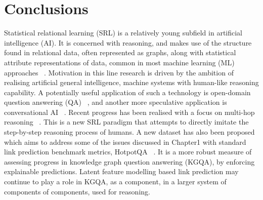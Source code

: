 
\chapter{Conclusions}  %

\ifpdf
    \graphicspath{{Chapter5/Figs/Raster/}{Chapter5/Figs/PDF/}{Chapter5/Figs/}}
\else
    \graphicspath{{Chapter5/Figs/Vector/}{Chapter5/Figs/}}
\fi



Statistical relational learning (SRL) is a relatively young subfield in artificial intelligence (AI). It is concerned with reasoning, and makes use of the structure found in relational data, often represented as graphs, along with statistical attribute representations of data, common in most machine learning (ML) approaches \unskip~\citep{koller2007introduction}. Motivation in this line research is driven by the ambition of realising artificial general intelligence, machine systems with human-like reasoning capability. A potentially useful application of such a technology is open-domain question answering (QA) \unskip~\citep{chen2017reading}, and another more speculative application is conversational AI \unskip~\citep{moon2019opendialkg, basu2019conversational}. Recent progress has been realised with a focus on multi-hop reasoning \unskip~\citep{asai2019learning, lin2018multi, qi2019answering}. This is a new SRL paradigm that attempts to directly imitate the step-by-step reasoning process of humans. A new dataset has also been proposed which aims to address some of the issues discussed in Chapter1 with standard link prediction benchmark metrics, HotpotQA \unskip~\citep{yang2018hotpotqa}. It is a more robust measure of assessing progress in knowledge graph question answering (KGQA), by enforcing explainable predictions. Latent feature modelling based link prediction may continue to play a role in KGQA, as a component, in a larger system of components of components, used for reasoning. \par   

